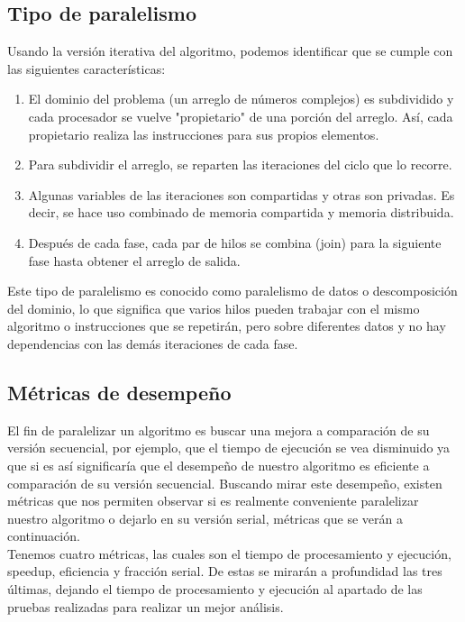 \documentclass{article}
\begin{document}
\subsection{Tipo de paralelismo}
Usando la versión iterativa del algoritmo, podemos identificar que se cumple con las siguientes características:
\begin{enumerate}
    \item El dominio del problema (un arreglo de números complejos) es subdividido y cada procesador se vuelve "propietario" de una porción del arreglo. Así, cada propietario realiza las instrucciones para sus propios elementos. 
    \item Para subdividir el arreglo, se reparten las iteraciones del ciclo que lo recorre.
    \item Algunas variables de las iteraciones son compartidas y otras son privadas. Es decir, se hace uso combinado de memoria compartida y memoria distribuida.
    \item Después de cada fase, cada par de hilos se combina (join) para la siguiente fase hasta obtener el arreglo de salida. 
\end{enumerate}
Este tipo de paralelismo es conocido como paralelismo de datos o descomposición del dominio, lo que significa que varios hilos pueden trabajar con el mismo algoritmo o instrucciones que se repetirán, pero sobre diferentes datos y no hay dependencias con las demás iteraciones de cada fase. 


\subsection{Métricas de desempeño}

El fin de paralelizar un algoritmo es buscar una mejora a comparación de su versión secuencial, por ejemplo, que el tiempo de ejecución se vea disminuido ya que si es así significaría que el desempeño de nuestro algoritmo es eficiente a comparación de su versión secuencial. Buscando mirar este desempeño, existen métricas que nos permiten observar si es realmente conveniente paralelizar nuestro algoritmo o dejarlo en su versión serial, métricas que se verán a continuación.\\

Tenemos cuatro métricas, las cuales son el tiempo de procesamiento y ejecución, speedup, eficiencia y fracción serial. De estas se mirarán a profundidad las tres últimas, dejando el tiempo de procesamiento y ejecución al apartado de las pruebas realizadas para realizar un mejor análisis.
\end{document}

